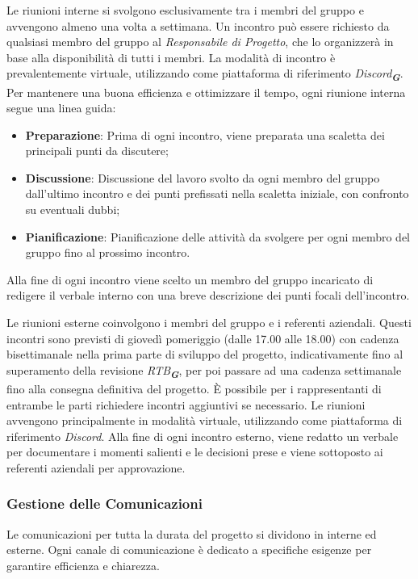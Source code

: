 Le riunioni interne si svolgono esclusivamente tra i membri del gruppo e avvengono almeno una volta a settimana. 
Un incontro può essere richiesto da qualsiasi membro del gruppo al \emph{Responsabile di Progetto}, che lo organizzerà in base alla disponibilità di tutti i membri. 
La modalità di incontro è prevalentemente virtuale, utilizzando come piattaforma di riferimento \emph{Discord}\textsubscript{\textit{\textbf{G}}}.
Per mantenere una buona efficienza e ottimizzare il tempo, ogni riunione interna segue una linea guida:
\begin{itemize}
    \item \textbf{Preparazione}: Prima di ogni incontro, viene preparata una scaletta dei principali punti da discutere;
    \item \textbf{Discussione}: Discussione del lavoro svolto da ogni membro del gruppo dall'ultimo incontro e dei punti prefissati nella scaletta iniziale, con confronto su eventuali dubbi;
    \item \textbf{Pianificazione}: Pianificazione delle attività da svolgere per ogni membro del gruppo fino al prossimo incontro.
\end{itemize}
Alla fine di ogni incontro viene scelto un membro del gruppo incaricato di redigere il verbale interno con una breve descrizione dei punti focali dell'incontro.

Le riunioni esterne coinvolgono i membri del gruppo e i referenti aziendali. Questi incontri sono previsti di giovedì pomeriggio (dalle 17.00 alle 18.00) con cadenza bisettimanale nella prima parte di sviluppo del progetto, 
indicativamente fino al superamento della revisione \emph{RTB}\textsubscript{\textit{\textbf{G}}}, per poi passare ad una cadenza settimanale fino alla consegna definitiva del progetto. 
È possibile per i rappresentanti di entrambe le parti richiedere incontri aggiuntivi se necessario.
Le riunioni avvengono principalmente in modalità virtuale, utilizzando come piattaforma di riferimento \emph{Discord}.
Alla fine di ogni incontro esterno, viene redatto un verbale per documentare i momenti salienti e le decisioni prese e viene sottoposto ai referenti aziendali per approvazione.

\subsubsection{Gestione delle Comunicazioni}
Le comunicazioni per tutta la durata del progetto si dividono in interne ed esterne. Ogni canale di comunicazione è dedicato a specifiche esigenze per garantire efficienza e chiarezza.

